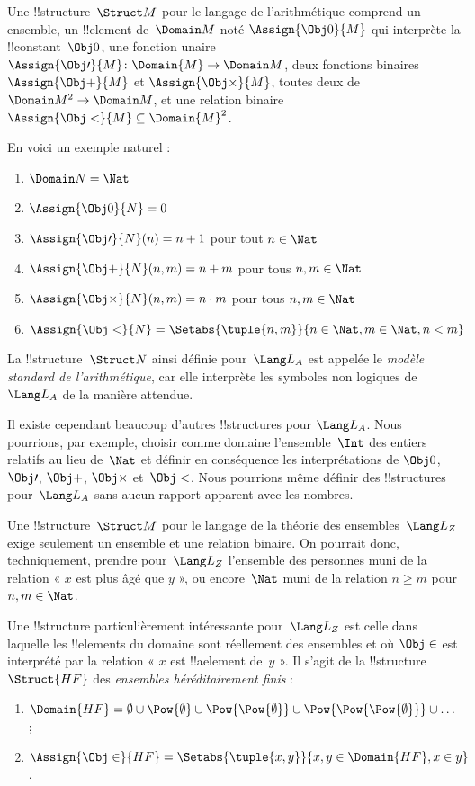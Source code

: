 \documentclass[../../../include/open-logic-section]{subfiles}
\begin{document}
\begin{ex}
Une !!{structure}~$\Struct M$ pour le langage de l'arithmétique
comprend un ensemble, un !!{element} de~$\Domain M$ noté
$\Assign{\Obj 0}{M}$ qui interprète la !!{constant}~$\Obj 0$,
une fonction unaire
$\Assign{\Obj \prime}{M} \colon \Domain{M} \to \Domain M$,
deux fonctions binaires $\Assign{\Obj +}{M}$ et
$\Assign{\Obj \times}{M}$, toutes deux de
$\Domain M^2 \to \Domain M$, et une relation binaire
$\Assign{\Obj <}{M} \subseteq \Domain{M}^2$.

En voici un exemple naturel :
\begin{enumerate}
\item $\Domain N = \Nat$
\item $\Assign{\Obj 0}{N} = 0$
\item $\Assign{\Obj \prime}{N}(n) = n + 1$ pour tout $n \in \Nat$
\item $\Assign{\Obj +}{N}(n, m) = n + m$ pour tous $n, m \in \Nat$
\item $\Assign{\Obj \times}{N}(n, m) = n\cdot m$ pour tous $n, m \in \Nat$
\item $\Assign{\Obj <}{N} = \Setabs{\tuple{n, m}}{n \in \Nat, m \in
  \Nat, n < m}$
\end{enumerate}
La !!{structure}~$\Struct N$ ainsi définie pour~$\Lang L_A$
est appelée le \emph{modèle standard de l'arithmétique}, car elle
interprète les symboles non logiques de~$\Lang L_A$ de la manière
attendue.

Il existe cependant beaucoup d'autres !!{structure}s pour
$\Lang L_A$. Nous pourrions, par exemple, choisir comme domaine
l'ensemble~$\Int$ des entiers relatifs au lieu de~$\Nat$ et définir
en conséquence les interprétations de $\Obj 0$, $\Obj \prime$,
$\Obj +$, $\Obj \times$ et~$\Obj <$.
Nous pourrions même définir des !!{structure}s pour~$\Lang L_A$
sans aucun rapport apparent avec les nombres.
\end{ex}

\begin{ex}
Une !!{structure}~$\Struct M$ pour le langage de la théorie des
ensembles~$\Lang L_Z$ exige seulement un ensemble et une relation
binaire. On pourrait donc, techniquement, prendre pour~$\Lang L_Z$
l'ensemble des personnes muni de la relation « $x$ est plus âgé que
$y$ », ou encore~$\Nat$ muni de la relation $n \ge m$ pour
$n, m \in \Nat$.

Une !!{structure} particulièrement intéressante pour~$\Lang L_Z$
est celle dans laquelle les !!{element}s du domaine sont réellement
des ensembles et où $\Obj \in$ est interprété par la relation
« $x$ est !!a{element} de~$y$ ». Il s'agit de la
!!{structure}~$\Struct{{HF}}$ des \emph{ensembles héréditairement
finis} :
\begin{enumerate}
\item $\Domain{{{HF}}} = \emptyset \cup \Pow{\emptyset} \cup
  \Pow{\Pow{\emptyset}} \cup \Pow{\Pow{\Pow{\emptyset}}} \cup \dots$ ;
\item $\Assign{\Obj \in}{{{HF}}} = \Setabs{\tuple{x, y}}{x, y \in
  \Domain{{{HF}}}, x \in y}$.
\end{enumerate}
\end{ex}
\end{document}
